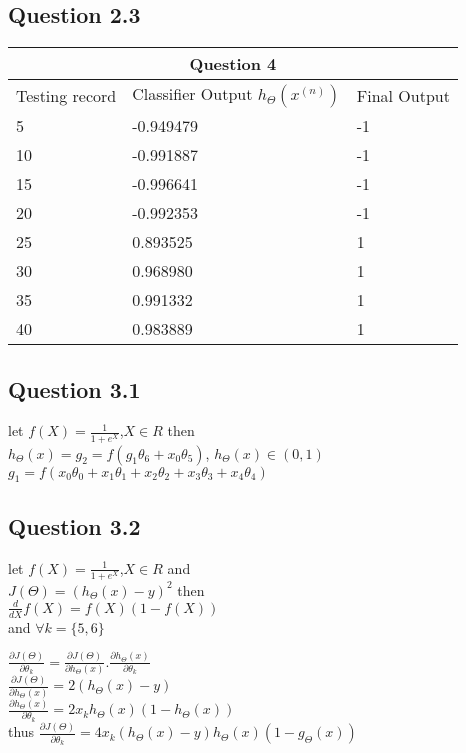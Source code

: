 \documentclass[10pt]{article}
\begin{document}
\subsection*{Question 2.3}
\begin{tabular}{ 
|p{3cm}||p{3cm}|p{3cm}|  }
 \hline
 \multicolumn{3}{|c|}{Question 4} \\
 \hline
 
 Testing record & Classifier Output $h_{\Theta}(x^{(n)})$ & Final Output\\
 \hline
 5&-0.949479&-1\\
 10&-0.991887&-1\\
 15&-0.996641&-1\\
 20&-0.992353&-1\\
 25&0.893525&1\\
 30&0.968980&1\\
 35&0.991332&1\\
 40&0.983889&1\\
 \hline
 
\end{tabular}

\subsection*{Question 3.1}
let $f(X) = \frac{1}{1 + e^{X}}$,\quad $ X \in R $ then\\
$h_{\Theta}(x) = g_{2} = f(g_{1} \theta_{6} + x_{0} \theta_{5}) $,  $h_{\Theta}(x) \in (0, 1)$\\
$g_{1} = f(x_{0} \theta_{0} + x_{1} \theta_{1} + x_{2} \theta_{2} + x_{3} \theta_{3} + x_{4} \theta_{4})$

\subsection*{Question 3.2}
let $f(X) = \frac{1}{1 + e^{X}}$,\quad $ X \in R $ and\\
$J(\Theta) = (h_{\Theta}(x) - y)^{2}$ then\\
$\frac{d}{d X} f(X) = f(X) (1 - f(X))$ \\ 
and \quad $\forall k = \{5, 6\}$ \\ \bigskip

$\frac{\partial J(\Theta)}{\partial \theta_{k}} = \frac{\partial J(\Theta)}{\partial h_{\Theta}(x)} . \frac{\partial h_{\Theta}(x)}{\partial \theta_{k}}$\\
$\frac{\partial J(\Theta)}{\partial h_{\Theta}(x)} = 2 (h_{\Theta}(x) - y)$ \\
$\frac{\partial h_{\Theta}(x)}{\partial \theta_{k}} = 2 x_{k} h_{\Theta}(x) (1 - h_{\Theta}(x))$\\
thus $\frac{\partial J(\Theta)}{\partial \theta_{k}} = 4 x_{k} (h_{\Theta}(x) - y) h_{\Theta}(x) (1 - g_{\Theta}(x))$ \\ \bigskip
\end{document}
